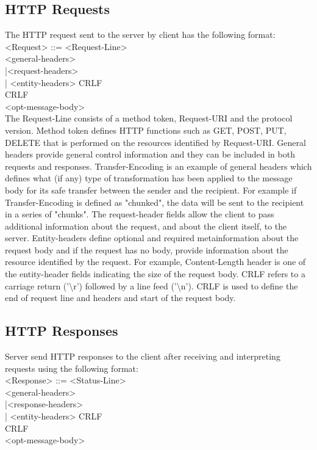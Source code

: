 \documentclass[a4paper,11pt,twoside]{article}
\begin{document}
\subsection{HTTP Requests} \label{Requests}
The HTTP request sent to the server by client has the following format:\\

		\indent
		<Request> ::= <Request-Line>\\
		\indent\indent\indent\indent
		\setlength\parindent{24pt}
		<general-headers>\\
		\indent\indent\indent\indent
		|<request-headers>\\
		\indent\indent\indent\indent
		| <entity-headers> CRLF\\
		\indent\indent\indent\indent
		CRLF \\
		\indent\indent\indent\indent
		<opt-message-body>\\

The Request-Line consists of a method token, Request-URI and the protocol version. Method token defines HTTP functions such as GET, POST, PUT, DELETE that is performed on the resources identified by Request-URI. General headers provide general control information and they can be included in both requests and responses. Transfer-Encoding is an example of general headers which defines what (if any) type of transformation has been applied to the message body for its safe transfer between the sender and the recipient. For example if Transfer-Encoding is defined as "chunked", the data will be sent to the recipient in a series of "chunks". The request-header fields allow the client to pass additional information about the request, and about the client itself, to the server. Entity-headers define optional and required metainformation about the request body and if the request has no body, provide information about the resource identified by the request. For example, Content-Length header is one of the entity-header fields indicating the size of the request body. CRLF refers to a carriage return ('\textbackslash r') followed by a line feed ('\textbackslash n'). CRLF is used to define the end of request line and headers and start of the request body.


\subsection{HTTP Responses}
Server send HTTP responses to the client after receiving and interpreting requests using the following format: \\
\indent
		<Response> ::= <Status-Line>\\
		\indent\indent\indent\indent
		\setlength\parindent{24pt}
		<general-headers>\\
		\indent\indent\indent\indent
		|<response-headers>\\
		\indent\indent\indent\indent
		| <entity-headers> CRLF\\
		\indent\indent\indent\indent
		CRLF \\
		\indent\indent\indent\indent
		<opt-message-body>\\
\end{document}
